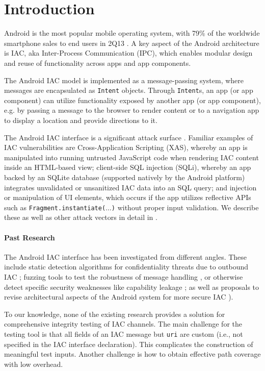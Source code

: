 \section{Introduction}\label{Se:introduction}

Android is the most popular mobile operating system, with 79\% of the worldwide smartphone sales to end users in 2Q13 \cite{gartner-android-share}. A key aspect of the Android architecture is IAC, aka Inter-Process Communication (IPC), which enables modular design and reuse of functionality across apps and app components.

The Android IAC model is implemented as a message-passing system, where messages are encapsulated as {\tt Intent} objects. Through {\tt Intent}s, an app (or app component) can utilize functionality exposed by another app (or app component), e.g. by passing a message to the browser to render content or to a navigation app to display a location and provide directions to it. 

The Android IAC interface is a significant attack surface \cite{CPGW:MOBISYS11,MAB:DSN12,EOM:SP09}. Familiar examples of IAC vulnerabilities are Cross-Application Scripting (XAS), whereby an app is manipulated into running untrusted JavaScript code when rendering IAC content inside an HTML-based view; client-side SQL injection (SQLi), whereby an app backed by an SQLite database (supported natively by the Android platform) integrates unvalidated or unsanitized IAC data into an SQL query; and injection or manipulation of UI elements, which occurs if the app utilizes reflective APIs such as {\tt Fragment.instantiate($\ldots$)} without proper input validation. We describe these as well as other attack vectors in detail in . 

\paragraph{Past Research} The Android IAC interface has been investigated from different angles. These include static detection algorithms for confidentiality threats due to outbound IAC \cite{EOM:SP09}; fuzzing tools to test the robustness of message handling \cite{MAB:DSN12}, or otherwise detect specific security weaknesses like capability leakage \cite{YZWZD:ACCS14}; as well as proposals to revise architectural aspects of the Android system for more secure IAC \cite{KCHW:SPSM12}).

To our knowledge, none of the existing research provides a solution for comprehensive integrity testing of IAC channels. The main challenge for the testing tool is that all fields of an IAC message but {\tt uri} are custom (i.e., not specified in the IAC interface declaration). This complicates the construction of meaningful test inputs. Another challenge is how to obtain effective path coverage with low overhead.

